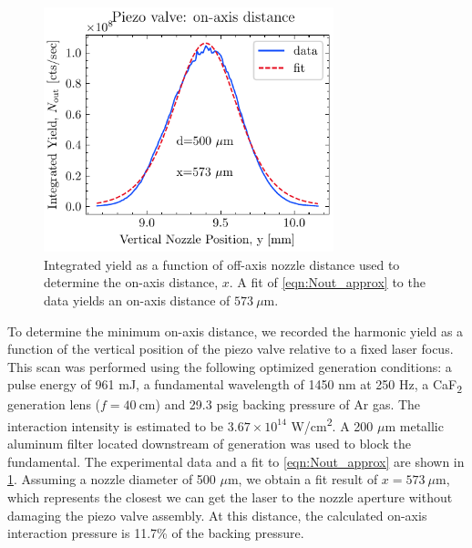 \begin{figure}
	\centering
	\includegraphics[width=0.75\textwidth]{figures/chap3/piezovalve_vscan.pdf}
	\caption{Integrated yield as a function of off-axis nozzle distance used to determine the on-axis distance, $x$. A fit of \cref{eqn:Nout_approx} to the data yields an on-axis distance of $573 \ \mu \textrm{m}$.}
	\label{fig:piezovalve_vscan}
\end{figure}

To determine the minimum on-axis distance, we recorded the harmonic yield as a function of the vertical position of the piezo valve relative to a fixed laser focus. This scan was performed using the following optimized generation conditions: a pulse energy of 961 mJ, a fundamental wavelength of 1450 nm at 250 Hz, a CaF\textsubscript{2} generation lens ($f = 40 \ \textrm{cm}$) and 29.3 psig backing pressure of Ar gas. The interaction intensity is estimated to be $3.67 \times 10^{14}$ W/cm\textsuperscript{2}. A 200 $\mu$m metallic aluminum filter located downstream of generation was used to block the fundamental. The experimental data and a fit to \cref{eqn:Nout_approx} are shown in \cref{fig:piezovalve_vscan}. Assuming a nozzle diameter of 500 $\mu$m, we obtain a fit result of $x = 573 \ \mu\textrm{m}$, which represents the closest we can get the laser to the nozzle aperture without damaging the piezo valve assembly. At this distance, the calculated on-axis interaction pressure is 11.7\% of the backing pressure.

